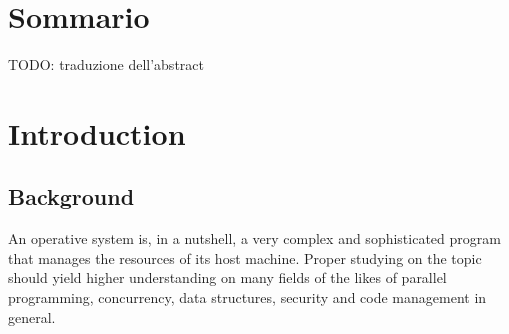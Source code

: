\documentclass[12pt,a4paper,openright,twoside]{report}
\begin{document}
\clearpage{\pagestyle{empty}\cleardoublepage}%
\chapter*{Sommario}
TODO: traduzione dell'abstract

\renewcommand\labelitemi{\tiny$\bullet$}

\clearpage{\pagestyle{empty}\cleardoublepage}
\tableofcontents                        %
\rhead[\fancyplain{}{\bfseries\leftmark}]{\fancyplain{}{\bfseries\thepage}}
\clearpage{\pagestyle{empty}\cleardoublepage}
\listoffigures                          %
\clearpage{\pagestyle{empty}\cleardoublepage}
\listoftables                           %
\clearpage{\pagestyle{empty}\cleardoublepage}
\chapter{Introduction}                %
\lhead[\fancyplain{}{\bfseries\thepage}]{\fancyplain{}{\bfseries\rightmark}}
\section{Background}
An operative system is, in a nutshell, a very complex and sophisticated program
that manages the resources of its host machine. Proper studying on the topic 
should yield higher understanding on many fields of the likes of
parallel programming, concurrency, data structures, security and 
code management in general.
\end{document}
